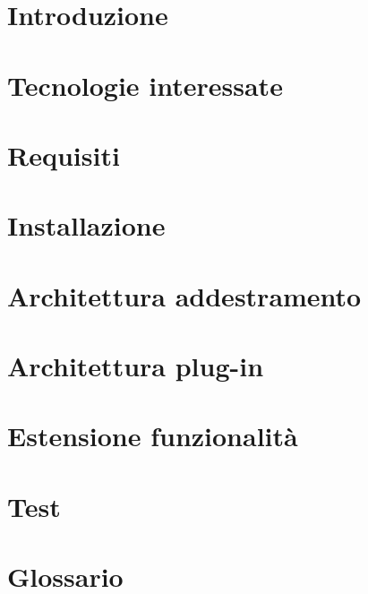 \documentclass{article}
\begin{document}


\section{Introduzione}%
\label{sec:introduzione}


\newpage

\section{Tecnologie interessate}
\label{sec:tecnologie_interessate}


\newpage

\section{Requisiti}
\label{sec:Requisiti}


\newpage

\section{Installazione}
\label{sec:installazione}


\newpage

\section{Architettura addestramento}
\label{sec:architettura_addestramento}


\newpage

\section{Architettura plug-in}
\label{sec:architettura_plugin}


\newpage

\section{Estensione funzionalità}
\label{sec:estensione_funzionalita}



\newpage

\section{Test}
\label{sec:test}


\newpage
\appendix
\setcounter{secnumdepth}{1} %
\section{Glossario}%
\label{sec:glossario}

\end{document}
